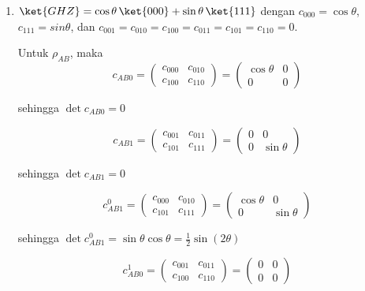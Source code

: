 \begin{enumerate}
	sehingga $\det c_{0BC}^1 = 0$.
	
	Maka
	\begin{equation}
		\mathrm{Tr}\,\rho_{BC}\tilde{\rho}_{BC}=2(\frac{1}{2})(\frac{1}{2})=\frac{1}{2}
	\end{equation}
	
	\item {$\ket{GHZ}=\cos\theta\,\ket{000} + \sin\theta\,\ket{111}$}
	dengan $c_{000}=\cos\theta$, $c_{111}=sin\theta$, dan $c_{001}=c_{010}=c_{100}=c_{011}=c_{101}=c_{110}=0$.
	
	Untuk $\rho_{AB}$, maka
	\begin{equation}
		c_{AB0}=
		\begin{pmatrix}
			c_{000} & c_{010} \\
			c_{100} & c_{110}
		\end{pmatrix}=
		\begin{pmatrix}
			\cos\theta & 0 \\
			0 & 0
		\end{pmatrix}
	\end{equation}
	
	sehingga $\det c_{AB0} = 0$
	
	\begin{equation}
		c_{AB1}=
		\begin{pmatrix}
			c_{001} & c_{011} \\
			c_{101} & c_{111}
		\end{pmatrix}=
		\begin{pmatrix}
			0 & 0 \\
			0 & \sin\theta
		\end{pmatrix}
	\end{equation}
	
	sehingga $\det c_{AB1} = 0$
	
	\begin{equation}
		c_{AB1}^0=
		\begin{pmatrix}
			c_{000} & c_{010} \\
			c_{101} & c_{111}
		\end{pmatrix}=
		\begin{pmatrix}
			\cos\theta & 0 \\
			0 & \sin\theta
		\end{pmatrix}
	\end{equation}
	
	sehingga $\det c_{AB1}^0 = \sin\theta \cos\theta = \frac{1}{2}\sin(2\theta)$
	
	\begin{equation}
		c_{AB0}^1=
		\begin{pmatrix}
			c_{001} & c_{011} \\
			c_{100} & c_{110}
		\end{pmatrix}=
		\begin{pmatrix}
			0 & 0 \\
			0 & 0
		\end{pmatrix}
	\end{equation}
	

\end{enumerate}
